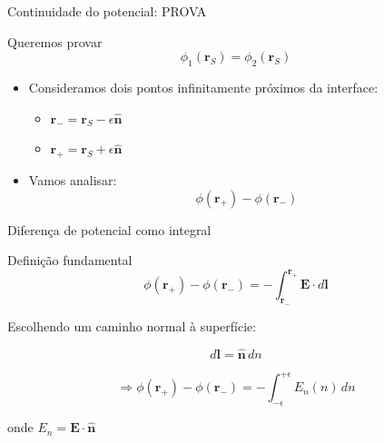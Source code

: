 \documentclass[aspectratio=169,11pt]{beamer}
\begin{document}
\begin{frame}{Continuidade do potencial: PROVA}
\begin{block}{Queremos provar}
\begin{equation}
\phi_1(\mathbf r_S)=\phi_2(\mathbf r_S)
\tag{3.20}
\end{equation}
\end{block}

\pause

\begin{itemize}
\item Consideramos dois pontos infinitamente próximos da interface:
\begin{itemize}
\item $\mathbf r_- = \mathbf r_S - \epsilon \hat{\mathbf n}$
\item $\mathbf r_+ = \mathbf r_S + \epsilon \hat{\mathbf n}$
\end{itemize}

\item Vamos analisar:
\begin{equation}
\phi(\mathbf r_+) - \phi(\mathbf r_-)
\end{equation}
\end{itemize}
\end{frame}

\begin{frame}{Diferença de potencial como integral}
\begin{block}{Definição fundamental}
\begin{equation}
\phi(\mathbf r_+) - \phi(\mathbf r_-)
=
-\int_{\mathbf r_-}^{\mathbf r_+} \mathbf E \cdot d\mathbf l
\end{equation}
\end{block}

\pause

Escolhendo um caminho normal à superfície:

\begin{equation}
d\mathbf l = \hat{\mathbf n}\, dn
\end{equation}

\pause

\begin{equation}
\Rightarrow
\phi(\mathbf r_+) - \phi(\mathbf r_-)
=
-\int_{-\epsilon}^{+\epsilon} E_n(n)\, dn
\end{equation}

\begin{center}
onde $E_n = \mathbf E \cdot \hat{\mathbf n}$
\end{center}
\end{frame}
\end{document}
